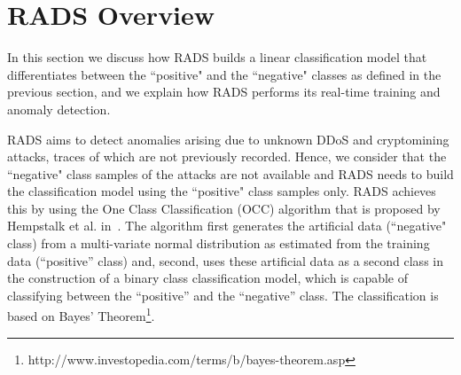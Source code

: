 \section{RADS Overview}
\label{sec:overview} 

\noindent In this section we discuss how RADS builds a linear classification model that differentiates between the ``positive" and the ``negative" classes as defined in the previous section, and we explain how RADS performs its real-time training and anomaly detection.

RADS aims to detect anomalies arising due to unknown DDoS and cryptomining attacks, traces of which are not previously recorded. Hence, we consider that the ``negative" class samples of the attacks are not available and RADS needs to build the classification model using the ``positive" class samples only. RADS achieves this by using the One Class Classification (OCC) algorithm that is proposed by Hempstalk et al. in~\cite{OCC:2008}. %
The algorithm first generates the artificial data (``negative" class) from a multi-variate normal distribution as estimated from the training data (``positive'' class) and, second, uses these artificial data as a second class in the construction of a binary class classification model, which is capable of classifying between the ``positive'' and the ``negative'' class. 
The classification is based on Bayes' Theorem\footnote{http://www.investopedia.com/terms/b/bayes-theorem.asp}.


